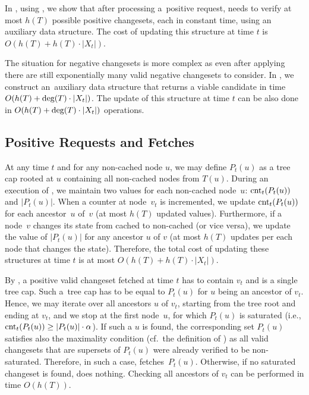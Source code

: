 In , using 
, we show that after processing 
a~positive request, \ALGTC needs to verify at most $h(T)$ possible positive changesets,
each in constant time, using an auxiliary data
structure. The cost of updating this structure at time $t$ is 
$O(h(T) + h(T) \cdot |X_t|)$.

The situation for negative changesets is more complex as even after applying
 there are still exponentially
many valid negative changesets to consider. In
, we construct an~auxiliary
data structure that returns a viable candidate in time $O(h(T) + \textrm{deg}(T)
\cdot |X_t|)$. The update of this structure at time $t$ can be also done in
$O(h(T) + \textrm{deg}(T) \cdot |X_t|)$ operations.

\subsection{Positive Requests and Fetches}
\label{sec:implementing_positive_counters}

At any time $t$ and for any non-cached node $u$, we may define $P_t(u)$ as a
tree cap rooted at $u$ containing all non-cached nodes from $T(u)$. During an
execution of \ALGTC, we maintain two values for each non-cached node~$u$:
$\textrm{cnt}_t(P_t(u))$ and $|P_t(u)|$. When a counter at node~$v_t$ is incremented, we
update $\textrm{cnt}_t(P_t(u))$ for each ancestor~$u$ of~$v$ (at most $h(T)$ updated
values). Furthermore, if a node~$v$ changes its state from cached to
non-cached (or vice versa), we update the value of $|P_t(u)|$ for any ancestor $u$
of $v$ (at most $h(T)$ updates per each node that changes the
state). Therefore, the total cost of updating these structures at time $t$ is
at most $O(h(T) + h(T) \cdot |X_t|)$.

By , a positive valid changeset
fetched at time $t$ has to contain $v_t$ and is a single tree cap. Such a~tree
cap has to be equal to $P_t(u)$ for $u$ being an ancestor of $v_t$. 
Hence, we may iterate over all
ancestors $u$ of $v_t$, starting from the tree root and ending at $v_t$, and
we stop at the first node~$u$, for which $P_t(u)$ is saturated (i.e.,
$\textrm{cnt}_t(P_t(u)) \geq |P_t(u)| \cdot \alpha$). If such a $u$ is found, the
corresponding set $P_t(u)$ satisfies also the maximality condition (cf.~the
definition of \ALGTC) as all valid changesets that are supersets of $P_t(u)$
were already verified to be non-saturated. Therefore, in such a case, \ALGTC
fetches~$P_t(u)$. Otherwise, if no saturated changeset is found, \ALGTC does
nothing. Checking all ancestors of $v_t$ can be performed in time $O(h(T))$.

